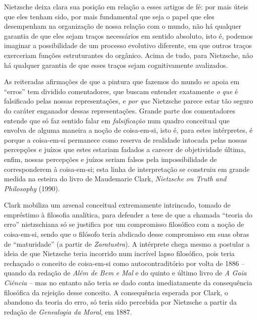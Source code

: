 \documentclass[
	12pt,				%
	openright,			%
	oneside,			%
	a4paper,			%
	english,			%
	french,				%
	spanish,			%
	brazil				%
	]{abntex2}
\begin{document}
	Nietzsche deixa clara sua posição em relação a esses artigos de fé: por mais úteis que eles tenham sido, por mais fundamental que seja o papel que eles desempenham na organização de nossa relação com o mundo, não há qualquer garantia de que eles sejam traços necessários em sentido absoluto, isto é, podemos imaginar a possibilidade de um processo evolutivo diferente, em que outros traços exerceriam funções estruturantes do orgânico. Acima de tudo, para Nietzsche, não há qualquer garantia de que esses traços sejam cognitivamente avalizados. 
	
As reiteradas afirmações de que a pintura que fazemos do mundo se apoia em “erros” tem dividido comentadores, que buscam entender exatamente \textit{o que} é falsificado pelas nossas representações, e \textit{por que} Nietzsche parece estar tão seguro do caráter enganador dessas representações. Grande parte dos comentadores entende que só faz sentido falar em \textit{falsificação} num quadro conceitual que envolva de alguma maneira a noção de coisa-em-si, isto é, para estes intérpretes, é porque a coisa-em-si permanece como reserva de realidade intocada pelas nossas percepções e juízos que estes estariam fadados a carecer de objetividade última, enfim, nossas percepções e juízos seriam falsos pela impossibilidade de corresponderem à coisa-em-si; esta linha de interpretação se construiu em grande medida na esteira do livro de Maudemarie Clark, \textit{Nietzsche on Truth and Philosophy} (1990). 

	Clark mobiliza um arsenal conceitual extremamente intrincado, tomado de empréstimo à filosofia analítica, para defender a tese de que a chamada “teoria do erro” nietzschiana só se justifica por um compromisso filosófico com a noção de coisa-em-si, sendo que o filósofo teria  abdicado desse compromisso em suas obras de “maturidade” (a partir de \textit{Zaratustra}). A intérprete chega mesmo a postular a ideia de que Nietzsche teria incorrido num incrível lapso filosófico, pois teria rechaçado o conceito de coisa-em-si como autocontraditório por volta de 1886 – quando da redação de \textit{Além de Bem e Mal} e do quinto e último livro de \textit{A Gaia Ciência} – mas no entanto não teria se dado conta imediatamente da consequência filosófica da rejeição desse conceito. A consequência esperada por Clark, o abandono da teoria do erro, só teria sido percebida por Nietzsche a partir da redação de \textit{Genealogia da Moral}, em 1887.
	
\end{document}

